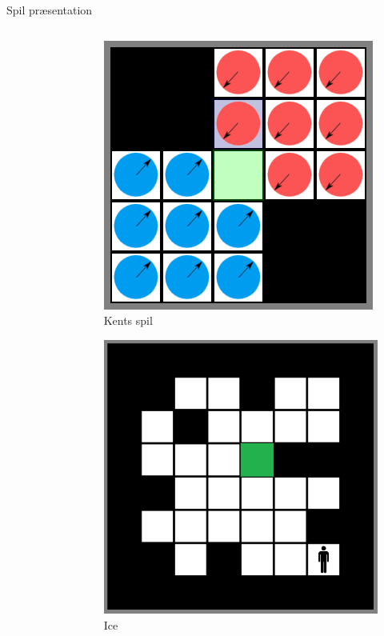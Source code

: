 \begin{frame}{Spil præsentation}
\begin{columns}
\begin{column}{.49\textwidth}
\begin{figure}[H]
		\end{figure}
	\end{column}
	\hfill
	\begin{column}{.49\textwidth}
		\begin{figure}[H]
   			\includegraphics[scale=0.23]{billeder/kentspil.png}
   			\caption{Kents spil}
		\end{figure}
		\begin{figure}[H]
   			\includegraphics[scale=0.18]{billeder/ice.png}
   			\caption{Ice}
		\end{figure}
	\end{column}
\end{columns}
\end{frame}

